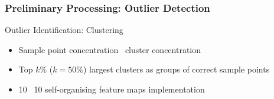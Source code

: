 \documentclass{beamer}
\theoremstyle{definition}
\begin{document}
\begin{frame}
\frametitle{Preliminary Processing: Outlier Detection}
Outlier Identification: Clustering
\begin{itemize}
	\item Sample point concentration \textrightarrow~cluster concentration
	\item Top $k\%$ ($k = 50\%$) largest clusters as groups of correct sample points
	\item 10 \texttimes~10 self-organising feature maps implementation
\end{itemize}
\end{frame}
%
%
%
%
\end{document}
